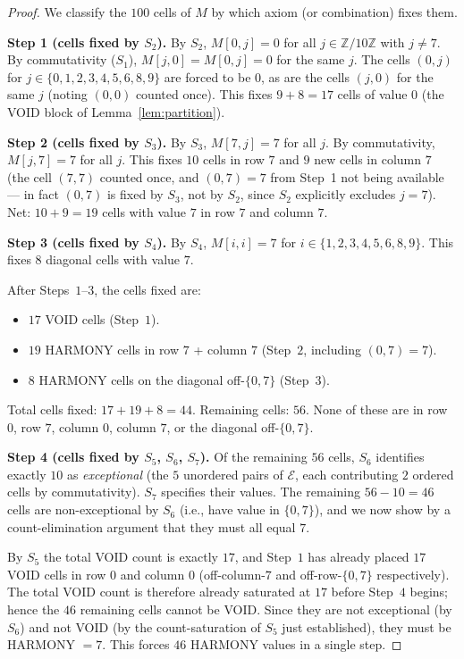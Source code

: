 \documentclass[11pt,reqno]{amsart}
\theoremstyle{plain}
\theoremstyle{definition}
\theoremstyle{remark}
\newcommand{\Z}{\mathbb{Z}}
\begin{document}
\begin{proof}
We classify the $100$ cells of $M$ by which axiom (or combination)
fixes them.

\smallskip
\noindent\textbf{Step 1 (cells fixed by $S_{2}$).}
By $S_{2}$, $M[0, j] = 0$ for all $j \in \Z/10\Z$ with $j \neq 7$.
By commutativity ($S_{1}$), $M[j, 0] = M[0, j] = 0$ for the same
$j$. The cells $(0, j)$ for $j \in \{0, 1, 2, 3, 4, 5, 6, 8, 9\}$
are forced to be $0$, as are the cells $(j, 0)$ for the same $j$
(noting $(0, 0)$ counted once). This fixes $9 + 8 = 17$ cells of
value $0$ (the VOID block of Lemma~\ref{lem:partition}).

\smallskip
\noindent\textbf{Step 2 (cells fixed by $S_{3}$).}
By $S_{3}$, $M[7, j] = 7$ for all $j$. By commutativity,
$M[j, 7] = 7$ for all $j$. This fixes $10$ cells in row $7$ and $9$
new cells in column $7$ (the cell $(7, 7)$ counted once, and
$(0, 7) = 7$ from Step~1 not being available --- in fact
$(0, 7)$ is fixed by $S_{3}$, not by $S_{2}$, since $S_{2}$
explicitly excludes $j = 7$). Net: $10 + 9 = 19$ cells with value $7$
in row $7$ and column $7$.

\smallskip
\noindent\textbf{Step 3 (cells fixed by $S_{4}$).}
By $S_{4}$, $M[i, i] = 7$ for $i \in \{1, 2, 3, 4, 5, 6, 8, 9\}$.
This fixes $8$ diagonal cells with value $7$.

\smallskip
After Steps~$1$--$3$, the cells fixed are:
\begin{itemize}
\item $17$ VOID cells (Step~$1$).
\item $19$ HARMONY cells in row $7$ + column $7$ (Step~$2$, including
$(0, 7) = 7$).
\item $8$ HARMONY cells on the diagonal off-$\{0, 7\}$ (Step~$3$).
\end{itemize}
Total cells fixed: $17 + 19 + 8 = 44$. Remaining cells: $56$. None of
these are in row $0$, row $7$, column $0$, column $7$, or the
diagonal off-$\{0, 7\}$.

\smallskip
\noindent\textbf{Step 4 (cells fixed by $S_{5}$, $S_{6}$, $S_{7}$).}
Of the remaining $56$ cells, $S_{6}$ identifies exactly $10$ as
\emph{exceptional} (the $5$ unordered pairs of $\mathcal{E}$, each
contributing $2$ ordered cells by commutativity). $S_{7}$ specifies
their values. The remaining $56 - 10 = 46$ cells are non-exceptional
by $S_{6}$ (i.e., have value in $\{0, 7\}$), and we now show by a
count-elimination argument that they must all equal $7$.

By $S_{5}$ the total VOID count is exactly $17$, and Step~$1$ has
already placed $17$ VOID cells in row $0$ and column $0$
(off-column-$7$ and off-row-$\{0, 7\}$ respectively). The total VOID
count is therefore already saturated at $17$ before Step~$4$ begins;
hence the $46$ remaining cells cannot be VOID. Since they are not
exceptional (by $S_{6}$) and not VOID (by the count-saturation of
$S_{5}$ just established), they must be HARMONY $= 7$. This forces
$46$ HARMONY values in a single step.


\end{proof}
\end{document}
